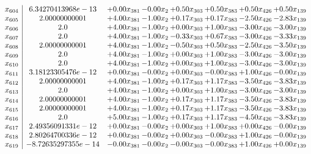 \documentclass[8pt]{article}
\begin{document}
\[\begin{array}{c| c c@{\hskip 2pt} c@{\hskip 2pt} c@{\hskip 2pt} c@{\hskip 2pt} c@{\hskip 2pt} c@{\hskip 2pt} }
 x_{604}   &  6.34270413968e-13 & +  0.00 x_{381} & -0.00 x_{2} & +  0.50 x_{303} & +  0.50 x_{383} & +  0.50 x_{426} & +  0.50 x_{139}\\
 x_{605}   &  2.00000000001 & +  4.00 x_{381} & -1.00 x_{2} & +  0.17 x_{303} & +  0.17 x_{383} & -2.50 x_{426} & -2.83 x_{139}\\
 x_{606}   &  2.0 & +  4.00 x_{381} & -1.00 x_{2} & +  0.00 x_{303} & +  1.00 x_{383} & -3.00 x_{426} & -3.00 x_{139}\\
 x_{607}   &  2.0 & +  4.00 x_{381} & -1.00 x_{2} & -0.33 x_{303} & +  0.67 x_{383} & -3.00 x_{426} & -3.33 x_{139}\\
 x_{608}   &  2.00000000001 & +  4.00 x_{381} & -1.00 x_{2} & -0.50 x_{303} & +  0.50 x_{383} & -2.50 x_{426} & -3.50 x_{139}\\
 x_{609}   &  2.0 & +  4.00 x_{381} & -1.00 x_{2} & +  0.00 x_{303} & +  1.00 x_{383} & -3.00 x_{426} & -3.00 x_{139}\\
 x_{610}   &  2.0 & +  4.00 x_{381} & -1.00 x_{2} & +  0.00 x_{303} & +  1.00 x_{383} & -3.00 x_{426} & -3.00 x_{139}\\
 x_{611}   &  3.18123305476e-12 & +  0.00 x_{381} & -0.00 x_{2} & +  0.00 x_{303} & -0.00 x_{383} & +  1.00 x_{426} & -0.00 x_{139}\\
 x_{612}   &  2.00000000001 & +  4.00 x_{381} & -1.00 x_{2} & +  0.17 x_{303} & +  1.17 x_{383} & -3.50 x_{426} & -3.83 x_{139}\\
 x_{613}   &  2.0 & +  4.00 x_{381} & -1.00 x_{2} & +  0.00 x_{303} & +  1.00 x_{383} & -3.00 x_{426} & -3.00 x_{139}\\
 x_{614}   &  2.00000000001 & +  4.00 x_{381} & -1.00 x_{2} & +  0.17 x_{303} & +  1.17 x_{383} & -3.50 x_{426} & -3.83 x_{139}\\
 x_{615}   &  2.00000000001 & +  4.00 x_{381} & -1.00 x_{2} & +  0.17 x_{303} & +  1.17 x_{383} & -3.50 x_{426} & -3.83 x_{139}\\
 x_{616}   &  2.0 & +  5.00 x_{381} & -1.00 x_{2} & +  0.17 x_{303} & +  1.17 x_{383} & -4.50 x_{426} & -3.83 x_{139}\\
 x_{617}   &  2.49356091331e-12 & +  0.00 x_{381} & -0.00 x_{2} & +  0.00 x_{303} & +  1.00 x_{383} & +  0.00 x_{426} & -0.00 x_{139}\\
 x_{618}   &  2.80264700336e-12 & +  0.00 x_{381} & -0.00 x_{2} & +  0.00 x_{303} & -0.00 x_{383} & +  1.00 x_{426} & -0.00 x_{139}\\
 x_{619}   &  -8.72635297355e-14 & -0.00 x_{381} & -0.00 x_{2} & -0.00 x_{303} & -0.00 x_{383} & +  1.00 x_{426} & +  0.00 x_{139}\\

\end{array}\]
\end{document}
